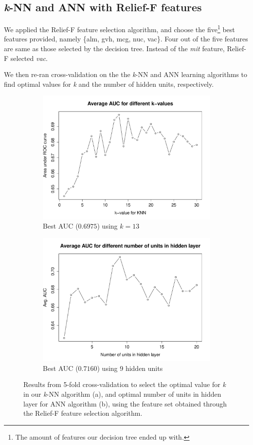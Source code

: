 \documentclass{article}
\begin{document}
\subsection{\textit{k}-NN and ANN with Relief-F features}

We applied the Relief-F feature selection algorithm, and choose the five\footnote{The amount of features our decision tree ended up with.} best features provided, namely \{alm, gvh, mcg, nuc, vac\}. Four out of the five features are same as those selected by the decision tree. Instead of the \textit{mit} feature, Relief-F selected \textit{vac}.

We then re-ran cross-validation on the the \textit{k}-NN and ANN learning algorithms to find optimal values for \textit{k} and the number of hidden units, respectively.

\begin{figure}[htbp]
\centering
\begin{subfigure}{.5\textwidth}
  \centering
  \includegraphics[width=.8\linewidth]{figures/knn-relieff.pdf}
  \caption{Best AUC ($0.6975$) using $k=13$}
  \label{fig:sub1}
\end{subfigure}%
\begin{subfigure}{.5\textwidth}
  \centering
  \includegraphics[width=.8\linewidth]{figures/ann-relieff.pdf}
  \caption{Best AUC ($0.7160$) using 9 hidden units}
  \label{fig:sub2}
\end{subfigure}
\caption{Results from 5-fold cross-validation to select the optimal value for \textit{k} in our \textit{k}-NN algorithm (a), and optimal number of units in hidden layer for ANN algorithm (b), using the feature set obtained through the Relief-F feature selection algorithm.}
\label{fig:test}
\end{figure}
\end{document}

